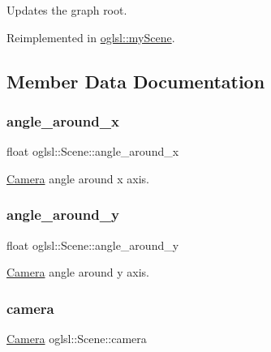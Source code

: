Updates the graph root. 



Reimplemented in \mbox{\hyperlink{classoglsl_1_1my_scene_a798dcfe11aee5c093013c59b665b6754}{oglsl\+::my\+Scene}}.



\subsection{Member Data Documentation}
\mbox{\label{classoglsl_1_1_scene_a3acba5c9ee3e2712b142550f5f06c488}} 
\subsubsection{\texorpdfstring{angle\+\_\+around\+\_\+x}{angle\_around\_x}}
{\footnotesize\ttfamily float oglsl\+::\+Scene\+::angle\+\_\+around\+\_\+x\hspace{0.3cm}{\ttfamily [protected]}}



\mbox{\hyperlink{classoglsl_1_1_camera}{Camera}} angle around x axis. 

\mbox{\label{classoglsl_1_1_scene_af8751fb0147fb71a1f4d5a0ddf94b99e}} 
\subsubsection{\texorpdfstring{angle\+\_\+around\+\_\+y}{angle\_around\_y}}
{\footnotesize\ttfamily float oglsl\+::\+Scene\+::angle\+\_\+around\+\_\+y\hspace{0.3cm}{\ttfamily [protected]}}



\mbox{\hyperlink{classoglsl_1_1_camera}{Camera}} angle around y axis. 

\mbox{\label{classoglsl_1_1_scene_a272ee5697b5bb4bfb725cb07b944dec4}} 
\subsubsection{\texorpdfstring{camera}{camera}}
{\footnotesize\ttfamily \mbox{\hyperlink{classoglsl_1_1_camera}{Camera}} oglsl\+::\+Scene\+::camera\hspace{0.3cm}{\ttfamily [protected]}}



